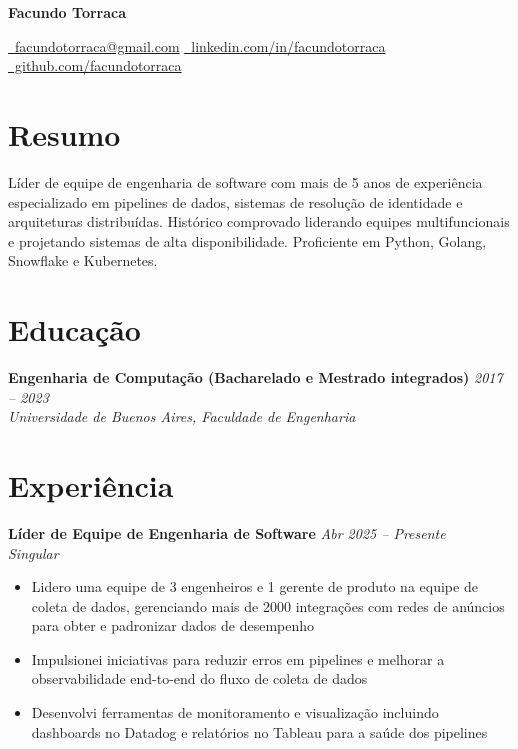 \documentclass[10pt,a4paper]{article}
\newcommand{\cventry}[3]{%
  \textbf{#1} \hfill \textit{#3}\\[3pt]
  \textit{#2}%
}
\begin{document}
\begin{center}
  {\LARGE\bfseries Facundo Torraca}

  \vspace{0.25cm}

  \href{mailto:facundotorraca@gmail.com}
    {\faEnvelope\ facundotorraca@gmail.com}
  \quad\textperiodcentered\quad
  \href{https://linkedin.com/in/facundotorraca}
    {\faLinkedin\ linkedin.com/in/facundotorraca}
  \quad\textperiodcentered\quad
  \href{https://github.com/facundotorraca}
    {\faGithub\ github.com/facundotorraca}
\end{center}

\section*{Resumo}
Líder de equipe de engenharia de software com mais de 5 anos de experiência
especializado em pipelines de dados, sistemas de resolução de identidade e
arquiteturas distribuídas. Histórico comprovado liderando equipes
multifuncionais e projetando sistemas de alta disponibilidade. Proficiente em
Python, Golang, Snowflake e Kubernetes.

\section*{Educação}

\cventry{Engenharia de Computação (Bacharelado e Mestrado integrados)}%
  {Universidade de Buenos Aires, Faculdade de Engenharia}{2017 -- 2023}

\section*{Experiência}

\cventry{Líder de Equipe de Engenharia de Software}{Singular}{Abr 2025 -- Presente}
\begin{itemize}[leftmargin=*, noitemsep, topsep=3pt, itemsep=2pt]
  \item Lidero uma equipe de 3 engenheiros e 1 gerente de produto na equipe de
        coleta de dados, gerenciando mais de 2000 integrações com redes de
        anúncios para obter e padronizar dados de desempenho
  \item Impulsionei iniciativas para reduzir erros em pipelines e melhorar a
        observabilidade end-to-end do fluxo de coleta de dados
  \item Desenvolvi ferramentas de monitoramento e visualização incluindo
        dashboards no Datadog e relatórios no Tableau para a saúde dos pipelines
\end{itemize}
\end{document}
